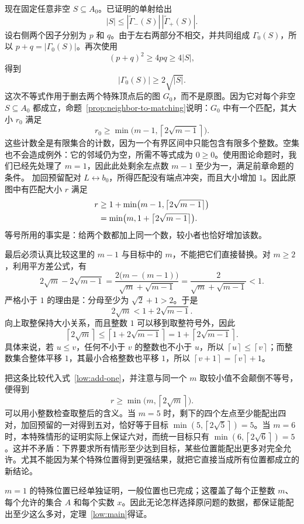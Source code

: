 \documentclass[UTF8,a4paper,oneside,openany,fontset=fandol,zihao=-4]{ctexbook}
\theoremstyle{guide}
\newcommand{\ceil}[1]{\left\lceil#1\right\rceil}
\begin{document}
现在固定任意非空 $S\subseteq A_0$。已证明的单射给出
\[
  |S|\leq
  |\widetilde\Gamma_-(S)|\,
  |\widetilde\Gamma_+(S)|.
\]
设右侧两个因子分别为 $p$ 和 $q$。由于左右两部分不相交，并共同组成 $\Gamma_0(S)$，所以 $p+q=|\Gamma_0(S)|$。再次使用
\[
  (p+q)^2\geq4pq\geq4|S|,
\]
得到
\[
  |\Gamma_0(S)|\geq2\sqrt{|S|}.
\]
这次不等式作用于删去两个特殊顶点后的图 $G_0$，而不是原图。因为它对每个非空 $S\subseteq A_0$ 都成立，命题~\ref{prop:neighbor-to-matching}说明：$G_0$ 中有一个匹配，其大小 $r_0$ 满足
\[
  r_0\geq
  \min\bigl(m-1,\ceil{2\sqrt{m-1}}\bigr).
\]
这些计数全是有限集合的计数，因为一个有界区间中只能包含有限多个整数。空集也不会造成例外：它的邻域仍为空，所需不等式成为 $0\geq0$。使用图论命题时，我们已经先处理了 $m=1$，因此此处剩余左点数 $m-1$ 至少为一，满足前章命题的条件。
加回预留配对 $L\leftrightarrow b_0$，所得匹配没有端点冲突，而且大小增加 $1$。因此原图中有匹配大小 $r$ 满足
\begin{align}
  r&\geq1+\min\bigl(m-1,\ceil{2\sqrt{m-1}}\bigr)\notag\\
   &=\min\bigl(m,1+\ceil{2\sqrt{m-1}}\bigr).
   \label{low:add-one}
\end{align}
等号所用的事实是：给两个数都加上同一个数，较小者也恰好增加该数。

最后必须认真比较这里的 $m-1$ 与目标中的 $m$，不能把它们直接替换。对 $m\geq2$，利用平方差公式，有
\[
  2\sqrt m-2\sqrt{m-1}
  =\frac{2\bigl(m-(m-1)\bigr)}{\sqrt m+\sqrt{m-1}}
  =\frac2{\sqrt m+\sqrt{m-1}}<1.
\]
严格小于 $1$ 的理由是：分母至少为 $\sqrt2+1>2$。于是
\[
  2\sqrt m<1+2\sqrt{m-1}.
\]
向上取整保持大小关系，而且整数 $1$ 可以移到取整符号外，因此
\[
  \ceil{2\sqrt m}
  \leq\ceil{1+2\sqrt{m-1}}
  =1+\ceil{2\sqrt{m-1}}.
\]
具体来说，若 $u\leq v$，任何不小于 $v$ 的整数也不小于 $u$，所以 $\ceil u\leq\ceil v$；而整数集合整体平移 $1$，其最小合格整数也平移 $1$，所以 $\ceil{v+1}=\ceil v+1$。

把这条比较代入式~\eqref{low:add-one}，并注意与同一个 $m$ 取较小值不会颠倒不等号，便得到
\[
  r\geq\min\bigl(m,\ceil{2\sqrt m}\bigr).
\]
可以用小整数检查取整后的含义。当 $m=5$ 时，剩下的四个左点至少能配出四对，加回预留的一对得到五对，恰好等于目标 $\min(5,\ceil{2\sqrt5})=5$。当 $m=6$ 时，本特殊情形的证明实际上保证六对，而统一目标只有 $\min(6,\ceil{2\sqrt6})=5$。这并不矛盾：下界要求所有情形至少达到目标，某些位置能配出更多对完全允许。尤其不能因为某个特殊位置得到更强结果，就把它直接当成所有位置都成立的新结论。

$m=1$ 的特殊位置已经单独证明，一般位置也已完成；这覆盖了每个正整数 $m$、每个允许的集合 $A$ 和每个实数 $x$。因此无论怎样选择原问题的数据，都保证能配出至少这么多对，定理~\ref{low:main}得证。
\end{document}
